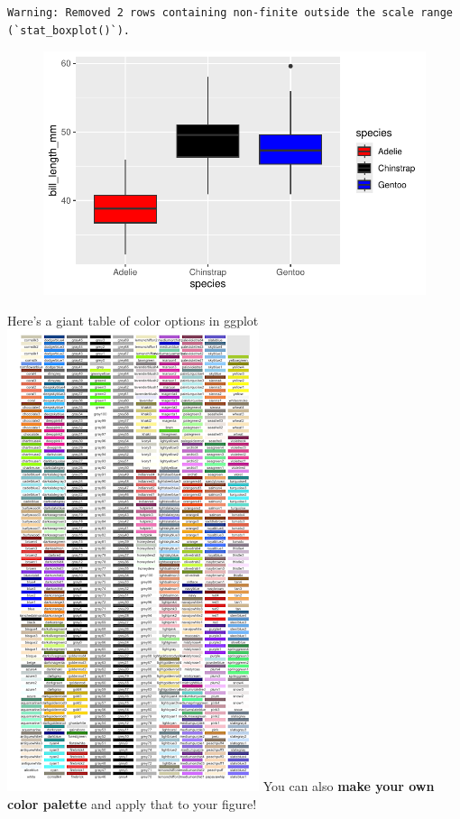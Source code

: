 \documentclass[
  letterpaper,
  DIV=11,
  numbers=noendperiod]{scrartcl}
\begin{document}
\begin{verbatim}
Warning: Removed 2 rows containing non-finite outside the scale range
(`stat_boxplot()`).
\end{verbatim}

\begin{figure}[H]

{\centering \includegraphics{Lab_2_files/figure-pdf/unnamed-chunk-25-1.pdf}

}

\end{figure}

Here's a giant table of color options in ggplot
\includegraphics{images/ggplot_colors.png} You can also \textbf{make
your own color palette} and apply that to your figure!
\end{document}
